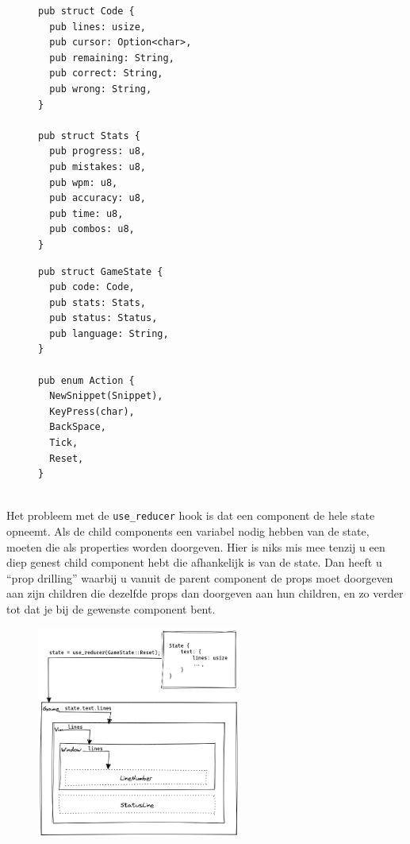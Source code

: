 \begin{figure}[h]
\centering
\begin{minipage}{.45\textwidth}
\begin{verbatim}
pub struct Code {
  pub lines: usize,
  pub cursor: Option<char>,
  pub remaining: String,
  pub correct: String,
  pub wrong: String,
}

pub struct Stats {
  pub progress: u8,
  pub mistakes: u8,
  pub wpm: u8,
  pub accuracy: u8,
  pub time: u8,
  pub combos: u8,
}
\end{verbatim}
\end{minipage}%
\begin{minipage}{.45\textwidth}
\begin{verbatim}
pub struct GameState {
  pub code: Code,
  pub stats: Stats,
  pub status: Status,
  pub language: String,
}

pub enum Action {
  NewSnippet(Snippet),
  KeyPress(char),
  BackSpace,
  Tick,
  Reset,
}


\end{verbatim}
\end{minipage}
\end{figure}

Het probleem met de \texttt{use_reducer} hook is dat een component de hele state opneemt.
Als de child components een variabel nodig hebben van de state, moeten die als properties worden
doorgeven. Hier is niks mis mee tenzij u een diep genest child component hebt die afhankelijk is
van de state. Dan heeft u “prop drilling” waarbij u vanuit de parent component de props moet
doorgeven aan zijn children die dezelfde props dan doorgeven aan hun children, en zo verder tot dat
je bij de gewenste component bent.

\clearpage

\begin{figure}[h]
  \centering
  \includegraphics[width=0.6\textwidth]{./figures/use_reducer.png}
\end{figure}

